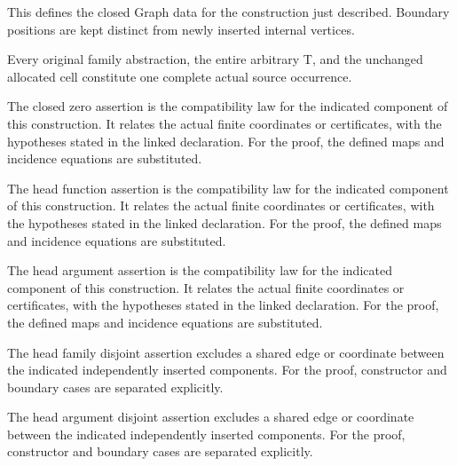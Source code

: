 This defines the closed Graph data for the construction just described. Boundary positions are kept distinct from newly inserted internal vertices.
\par{}

Every original family abstraction, the entire arbitrary T, and the unchanged allocated cell constitute one complete actual source occurrence.
\par{}

The closed zero assertion is the compatibility law for the indicated component of this construction. It relates the actual finite coordinates or certificates, with the hypotheses stated in the linked declaration.
For the proof, the defined maps and incidence equations are substituted.
\par{}

The head function assertion is the compatibility law for the indicated component of this construction. It relates the actual finite coordinates or certificates, with the hypotheses stated in the linked declaration.
For the proof, the defined maps and incidence equations are substituted.
\par{}

The head argument assertion is the compatibility law for the indicated component of this construction. It relates the actual finite coordinates or certificates, with the hypotheses stated in the linked declaration.
For the proof, the defined maps and incidence equations are substituted.
\par{}

The head family disjoint assertion excludes a shared edge or coordinate between the indicated independently inserted components.
For the proof, constructor and boundary cases are separated explicitly.
\par{}

The head argument disjoint assertion excludes a shared edge or coordinate between the indicated independently inserted components.
For the proof, constructor and boundary cases are separated explicitly.
\par{}


